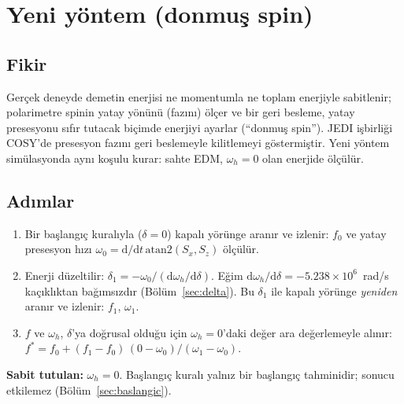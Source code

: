 \documentclass[11pt,a4paper]{article}
\begin{document}
\section{Yeni yöntem (donmuş spin)}

\subsection{Fikir}
Gerçek deneyde demetin enerjisi ne momentumla ne toplam enerjiyle sabitlenir; polarimetre spinin yatay
yönünü (fazını) ölçer ve bir geri besleme, yatay presesyonu sıfır tutacak biçimde enerjiyi ayarlar
(``donmuş spin''). JEDI işbirliği COSY'de presesyon fazını geri beslemeyle kilitlemeyi göstermiştir. Yeni
yöntem simülasyonda aynı koşulu kurar: sahte EDM, $\omega_h=0$ olan enerjide ölçülür.

\subsection{Adımlar}
\begin{enumerate}[nosep]
\item Bir başlangıç kuralıyla ($\delta=0$) kapalı yörünge aranır ve izlenir: $f_0$ ve yatay presesyon hızı
$\omega_0=\mathrm{d}/\mathrm{d}t\,\mathrm{atan2}(S_x,S_z)$ ölçülür.
\item Enerji düzeltilir: $\delta_1=-\omega_0/(\mathrm{d}\omega_h/\mathrm{d}\delta)$. Eğim
$\mathrm{d}\omega_h/\mathrm{d}\delta=-5.238\times10^6$~rad/s kaçıklıktan bağımsızdır (Bölüm~\ref{sec:delta}).
Bu $\delta_1$ ile kapalı yörünge \emph{yeniden} aranır ve izlenir: $f_1$, $\omega_1$.
\item $f$ ve $\omega_h$, $\delta$'ya doğrusal olduğu için $\omega_h=0$'daki değer ara değerlemeyle alınır:
$f^*=f_0+(f_1-f_0)\,(0-\omega_0)/(\omega_1-\omega_0)$.
\end{enumerate}
\textbf{Sabit tutulan:} $\omega_h=0$. Başlangıç kuralı yalnız bir başlangıç tahminidir; sonucu etkilemez
(Bölüm~\ref{sec:baslangic}).
\end{document}
